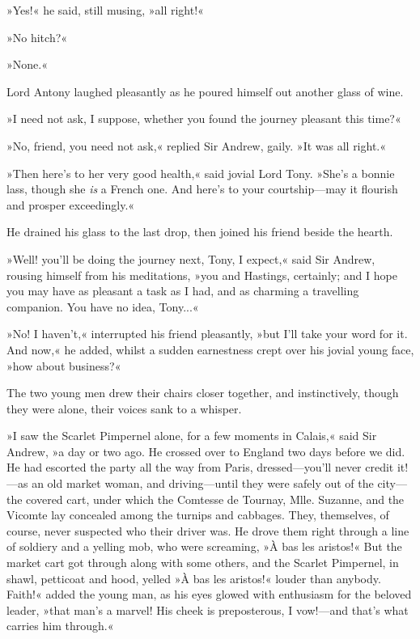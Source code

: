 »Yes!« he said, still musing, »all right!«

»No hitch?«

»None.«

Lord Antony laughed pleasantly as he poured himself out another glass of wine.

»I need not ask, I suppose, whether you found the journey pleasant this time?«

»No, friend, you need not ask,« replied Sir Andrew, gaily. »It was all right.«

»Then here's to her very good health,« said jovial Lord Tony. »She's a bonnie lass, though she \textit{is} a French one. And here's to your courtship\allowbreak---\allowbreak may it flourish and prosper exceedingly.«

He drained his glass to the last drop, then joined his friend beside the hearth.

»Well! you'll be doing the journey next, Tony, I expect,« said Sir Andrew, rousing himself from his meditations, »you and Hastings, certainly; and I hope you may have as pleasant a task as I had, and as charming a travelling companion. You have no idea, Tony...«

»No! I haven't,« interrupted his friend pleasantly, »but I'll take your word for it. And now,« he added, whilst a sudden earnestness crept over his jovial young face, »how about business?«

The two young men drew their chairs closer together, and instinctively, though they were alone, their voices sank to a whisper.

»I saw the Scarlet Pimpernel alone, for a few moments in Calais,« said Sir Andrew, »a day or two ago. He crossed over to England two days before we did. He had escorted the party all the way from Paris, dressed\allowbreak---\allowbreak you'll never credit it!\allowbreak---\allowbreak as an old market woman, and driving\allowbreak---\allowbreak until they were safely out of the city\allowbreak---\allowbreak the covered cart, under which the Comtesse de Tournay, Mlle. Suzanne, and the Vicomte lay concealed among the turnips and cabbages. They, themselves, of course, never suspected who their driver was. He drove them right through a line of soldiery and a yelling mob, who were screaming, »À bas les aristos!« But the market cart got through along with some others, and the Scarlet Pimpernel, in shawl, petticoat and hood, yelled »À bas les aristos!« louder than anybody. Faith!« added the young man, as his eyes glowed with enthusiasm for the beloved leader, »that man's a marvel! His cheek is preposterous, I vow!\allowbreak---\allowbreak and that's what carries him through.«


